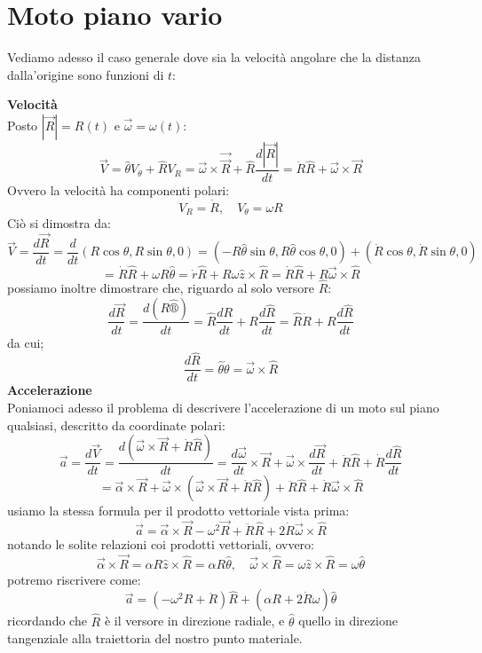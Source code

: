 \documentclass[a4paper,12pt]{article}
\begin{document}
\section{Moto piano vario}
Vediamo adesso il caso generale dove sia la velocità angolare che la distanza dalla'origine sono funzioni di $t$:
\par\smallskip
\textbf{Velocità} \\
Posto $|\vec{R}| = R(t)$ e $\vec{\omega} = \omega(t) $:
$$ \vec{V} = \hat{\theta}V_{\theta} + \hat{R}V_R = \vec{\omega} \times \vec{\vec{R}} + \hat{R} \frac{d|\vec{R}|}{dt}
= \dot{R}\hat{R} + \vec{\omega} \times \vec{R} $$
Ovvero la velocità ha componenti polari:
$$ V_R = \dot{R}, \quad V_{\theta} = \omega R $$
Ciò si dimostra da:
$$ \vec{V} = \frac{d\vec{R}}{dt} = \frac{d}{dt}(R\cos{\theta}, R\sin{\theta}, 0) 
= (-R\hat{\theta}\sin{\theta}, R\hat{\theta}\cos{\theta}, 0) + (\dot{R}\cos{\theta}, \dot{R}\sin{\theta}, 0) $$
$$ = \dot{R}\hat{R} + \omega R \hat{\theta} = \dot{r} \hat{R} + R \omega \hat{z} \times \hat{R} = \dot{R}\hat{R} + R\vec{\omega} \times \hat{R}$$
possiamo inoltre dimostrare che, riguardo al solo versore $\hat{R}$:
$$ \frac{d\vec{R}}{dt} = \frac{d(R\hat{®})}{dt} = \hat{R}\frac{dR}{dt} + R\frac{d\hat{R}}{dt} = \hat{R}\dot{R} + R\frac{d\hat{R}}{dt}$$
da cui;
$$ \frac{d\hat{R}}{dt} = \hat{\theta}\dot{\theta} = \vec{\omega} \times \hat{R} $$
\textbf{Accelerazione} \\
Poniamoci adesso il problema di descrivere l'accelerazione di un moto sul piano qualsiasi, descritto da coordinate
polari:
$$ \vec{a} = \frac{d\vec{V}}{dt} = \frac{d(\vec{\omega} \times \vec{R} + \dot{R}\hat{R})}{dt} = \frac{d\vec{\omega}}{dt} \times \vec{R} + \vec{\omega} \times \frac{d\vec{R}}{dt} + \ddot{R}\hat{{R}} + \dot{R}\frac{d\hat{R}}{dt}$$
$$ = \vec{\alpha} \times \vec{R} + \vec{\omega} \times (\vec{\omega} \times \vec{R} + \dot{R}\hat{R}) + \ddot{R}\hat{R} + \dot{R}\vec{\omega} \times \hat{R} $$
usiamo la stessa formula per il prodotto vettoriale vista prima:
$$ \vec{a} = \vec{\alpha} \times \vec{R} - \omega^2 \vec{R} + \ddot{R}\hat{R} + 2\dot{R}\vec{\omega} \times \hat{R} $$
notando le solite relazioni coi prodotti vettoriali, ovvero:
$$ \vec{\alpha} \times \vec{R} = \alpha R \hat{z} \times \hat{R} = \alpha R \hat{\theta}, \quad \vec{\omega} \times \hat{R} = \omega \hat{z} \times \hat{R} = \omega \hat{\theta} $$
potremo riscrivere come:
$$ \vec{a} = (-\omega^2 R + \ddot{R})\hat{R} + (\alpha R + 2\dot{R}\omega)\hat{\theta} $$
ricordando che $\hat{R}$ è il versore in direzione radiale, e $\hat{\theta}$ quello in direzione tangenziale alla traiettoria del
nostro punto materiale.
\end{document}
